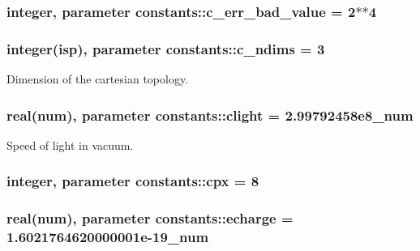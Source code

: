 \subsubsection[{\texorpdfstring{c\+\_\+err\+\_\+bad\+\_\+value}{c_err_bad_value}}]{\setlength{\rightskip}{0pt plus 5cm}integer, parameter constants\+::c\+\_\+err\+\_\+bad\+\_\+value = 2$\ast$$\ast$4}\hypertarget{namespaceconstants_a0c96dab545557ad23bf55d7576f5405f}{}\label{namespaceconstants_a0c96dab545557ad23bf55d7576f5405f}
\subsubsection[{\texorpdfstring{c\+\_\+ndims}{c_ndims}}]{\setlength{\rightskip}{0pt plus 5cm}integer({\bf isp}), parameter constants\+::c\+\_\+ndims = 3}\hypertarget{namespaceconstants_aad8d45b739c41f2926fd2accb3de9dd2}{}\label{namespaceconstants_aad8d45b739c41f2926fd2accb3de9dd2}


Dimension of the cartesian topology. 

\subsubsection[{\texorpdfstring{clight}{clight}}]{\setlength{\rightskip}{0pt plus 5cm}real({\bf num}), parameter constants\+::clight = 2.\+99792458e8\+\_\+num}\hypertarget{namespaceconstants_ac23d8857383002cada2aa571fd859533}{}\label{namespaceconstants_ac23d8857383002cada2aa571fd859533}


Speed of light in vacuum. 

\subsubsection[{\texorpdfstring{cpx}{cpx}}]{\setlength{\rightskip}{0pt plus 5cm}integer, parameter constants\+::cpx = 8}\hypertarget{namespaceconstants_a5709f0ae2ee52b1906446ad25ed0f587}{}\label{namespaceconstants_a5709f0ae2ee52b1906446ad25ed0f587}
\subsubsection[{\texorpdfstring{echarge}{echarge}}]{\setlength{\rightskip}{0pt plus 5cm}real({\bf num}), parameter constants\+::echarge = 1.\+6021764620000001e-\/19\+\_\+num}\hypertarget{namespaceconstants_af0f1098f6be55eab4174890ed5caaf98}{}\label{namespaceconstants_af0f1098f6be55eab4174890ed5caaf98}


